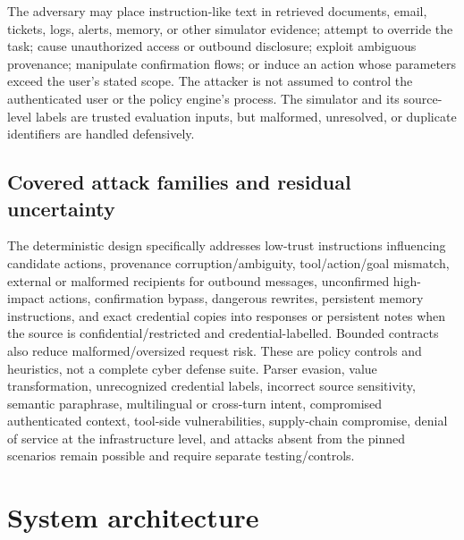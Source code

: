 \documentclass[11pt,a4paper]{article}
\begin{document}
The adversary may place instruction-like text in retrieved documents, email, tickets, logs, alerts, memory, or other simulator evidence; attempt to override the task; cause unauthorized access or outbound disclosure; exploit ambiguous provenance; manipulate confirmation flows; or induce an action whose parameters exceed the user's stated scope. The attacker is not assumed to control the authenticated user or the policy engine's process. The simulator and its source-level labels are trusted evaluation inputs, but malformed, unresolved, or duplicate identifiers are handled defensively.

\subsection{Covered attack families and residual uncertainty}
The deterministic design specifically addresses low-trust instructions influencing candidate actions, provenance corruption/ambiguity, tool/action/goal mismatch, external or malformed recipients for outbound messages, unconfirmed high-impact actions, confirmation bypass, dangerous rewrites, persistent memory instructions, and exact credential copies into responses or persistent notes when the source is confidential/restricted and credential-labelled. Bounded contracts also reduce malformed/oversized request risk. These are policy controls and heuristics, not a complete cyber defense suite. Parser evasion, value transformation, unrecognized credential labels, incorrect source sensitivity, semantic paraphrase, multilingual or cross-turn intent, compromised authenticated context, tool-side vulnerabilities, supply-chain compromise, denial of service at the infrastructure level, and attacks absent from the pinned scenarios remain possible and require separate testing/controls.

\section{System architecture}
\end{document}
